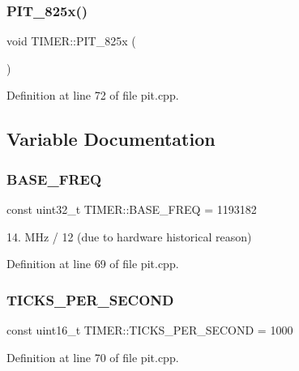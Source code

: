 \subsubsection{\texorpdfstring{P\+I\+T\+\_\+825x()}{PIT\_825x()}}
{\footnotesize\ttfamily void T\+I\+M\+E\+R\+::\+P\+I\+T\+\_\+825x (\begin{DoxyParamCaption}{ }\end{DoxyParamCaption})}



Definition at line 72 of file pit.\+cpp.



\subsection{Variable Documentation}
\mbox{\label{namespace_t_i_m_e_r_a5e00501463f93ce13bbbc8b9798cdc2c}} 
\subsubsection{\texorpdfstring{B\+A\+S\+E\+\_\+\+F\+R\+EQ}{BASE\_FREQ}}
{\footnotesize\ttfamily const uint32\+\_\+t T\+I\+M\+E\+R\+::\+B\+A\+S\+E\+\_\+\+F\+R\+EQ = 1\textquotesingle{}193\textquotesingle{}182}



14. M\+Hz / 12 (due to hardware historical reason) 



Definition at line 69 of file pit.\+cpp.

\mbox{\label{namespace_t_i_m_e_r_aae36b4824645d9f2f506cd1199817117}} 
\subsubsection{\texorpdfstring{T\+I\+C\+K\+S\+\_\+\+P\+E\+R\+\_\+\+S\+E\+C\+O\+ND}{TICKS\_PER\_SECOND}}
{\footnotesize\ttfamily const uint16\+\_\+t T\+I\+M\+E\+R\+::\+T\+I\+C\+K\+S\+\_\+\+P\+E\+R\+\_\+\+S\+E\+C\+O\+ND = 1\textquotesingle{}000}



Definition at line 70 of file pit.\+cpp.


